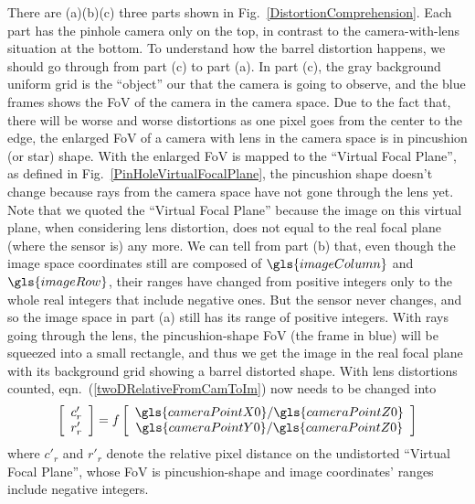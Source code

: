 There are (a)(b)(c) three parts shown in Fig.~\ref{DistortionComprehension}. Each part has the pinhole camera only on the top, in contrast to the camera-with-lens situation at the bottom. To understand how the barrel distortion happens, we should go through from part (c) to part (a). In part (c), the gray background uniform grid is the \enquote{object} our that the camera is going to observe, and the blue frames shows the \gls{FoV} of the camera in the camera space. Due to the fact that, there will be worse and worse distortions as one pixel goes from the center to the edge, the enlarged \gls{FoV} of a camera with lens in the camera space is in pincushion (or star) shape. With the enlarged \gls{FoV} is mapped to the \enquote{Virtual Focal Plane}, as defined in Fig.~\ref{PinHoleVirtualFocalPlane}, the pincushion shape doesn't change because rays from the camera space have not gone through the lens yet. Note that we quoted the \enquote{Virtual Focal Plane} because the image on this virtual plane, when considering lens distortion, does not equal to the real focal plane (where the sensor is) any more. We can tell from part (b) that, even though the image space coordinates still are composed of \(\gls{imageColumn}\) and \(\gls{imageRow}\), their ranges have changed from positive integers only to the whole real integers that include negative ones. But the sensor never changes, and so the image space in part (a) still has its range of positive integers. With rays going through the lens, the pincushion-shape \gls{FoV} (the frame in blue) will be squeezed into a small rectangle, and thus we get the image in the real focal plane with its background grid showing a barrel distorted shape. %
With lens distortions counted, eqn.~(\ref{twoDRelativeFromCamToIm}) now needs to be changed into 
%
\begin{equation}
\left[ \begin{array}{c} c'_r \\ r'_r \end{array} \right] %
= f %
\left[ \begin{array}{c} \gls{cameraPointX0}/\gls{cameraPointZ0} \\ \gls{cameraPointY0}/\gls{cameraPointZ0} \end{array} \right]%
\label{undistortedRelativeFromCamToIm}
\end{equation}
where \(c'_r\) and \(r'_r\) denote the relative pixel distance on the undistorted \enquote{Virtual Focal Plane}, whose \gls{FoV} is pincushion-shape and image coordinates' ranges include negative integers.%
